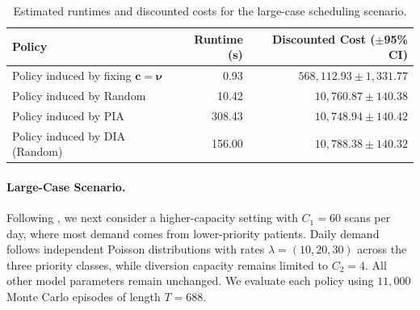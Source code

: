 \documentclass[sglanonrev]{informs4}
\providecommand{\bc}{\boldsymbol{c}}
\def\edits#1{{\color{black}#1}}
\begin{document}



\begin{table}[ht]
\centering
\footnotesize
\begin{tabular}{lrr}
  \toprule
  \textbf{Policy} & \textbf{Runtime (s)} & \textbf{Discounted Cost ($\pm$95\% \ac{CI})} \\
  \midrule
  Policy induced by fixing $\bc=\boldsymbol{\nu}$          & 0.93 & $568,112.93 \pm 1,331.77$ \\
  Policy induced by Random   & 10.42 & $10,760.87 \pm 140.38$ \\
  Policy induced by \ac{PIA}            & 308.43 & $10,748.94 \pm 140.42$ \\
  Policy induced by \ac{DIA} (Random)  & 156.00 & $10,788.38 \pm 140.32$ \\
  \bottomrule
\end{tabular}
\caption{Estimated runtimes and discounted costs for the large-case scheduling scenario.}
\label{tab:scheduling_large}
\end{table}

\smallskip
\paragraph{Large-Case Scenario.} \edits{Following \citet{patrick2008dynamic}, we next consider a higher-capacity setting with $C_1=60$ scans per day, where most demand comes from lower-priority patients. Daily demand follows independent Poisson distributions with rates $\lambda=(10,20,30)$ across the three priority classes, while diversion capacity remains limited to $C_2=4$. All other model parameters remain unchanged. We evaluate each policy using $11,000$ Monte Carlo episodes of length $T=688$.}
\end{document}
